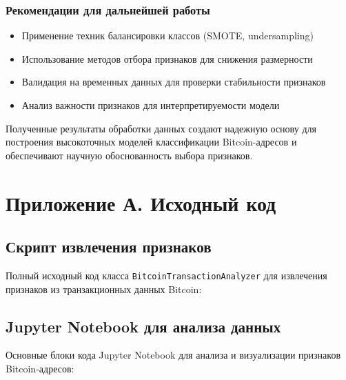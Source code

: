 \subsubsection{Рекомендации для дальнейшей работы}

\begin{itemize}
    \item Применение техник балансировки классов (SMOTE, undersampling)
    \item Использование методов отбора признаков для снижения размерности
    \item Валидация на временных данных для проверки стабильности признаков
    \item Анализ важности признаков для интерпретируемости модели
\end{itemize}

Полученные результаты обработки данных создают надежную основу для построения высокоточных моделей классификации Bitcoin-адресов и обеспечивают научную обоснованность выбора признаков.

\section{Приложение А. Исходный код}

\subsection{Скрипт извлечения признаков}

Полный исходный код класса \texttt{BitcoinTransactionAnalyzer} для извлечения признаков из транзакционных данных Bitcoin:



\subsection{Jupyter Notebook для анализа данных}

Основные блоки кода Jupyter Notebook для анализа и визуализации признаков Bitcoin-адресов:


